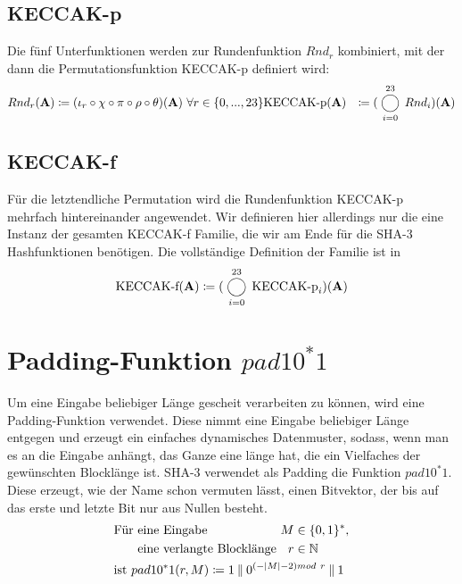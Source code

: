 \subsection{KECCAK-p}
Die fünf Unterfunktionen werden zur Rundenfunktion $Rnd_r$ kombiniert, mit der dann die Permutationsfunktion KECCAK-p definiert wird:
\begin{align*}
	Rnd_r(\textbf{A}) & \coloneq (\iota_r \circ \chi \circ \pi \circ \rho \circ \theta)(\textbf{A})\ \forall r \in \{0,...,23\}
    \text{KECCAK-p} (\textbf{A}) & \coloneq (\bigcomp_{i = 0}^{23} Rnd_i)(\textbf{A}) \\
\end{align*}

\subsection{KECCAK-f}
Für die letztendliche Permutation wird die Rundenfunktion KECCAK-p mehrfach hintereinander angewendet.
Wir definieren hier allerdings nur die eine Instanz der gesamten KECCAK-f Familie, die wir am Ende für die SHA-3 Hashfunktionen benötigen.
Die vollständige Definition der Familie ist in  
\begin{align*}
    \text{KECCAK-f} (\textbf{A}) \coloneq (\bigcomp_{i = 0}^{23} \text{KECCAK-p}_{i})(\textbf{A})
\end{align*}

\section{Padding-Funktion $pad10^*1$}
Um eine Eingabe beliebiger Länge gescheit verarbeiten zu können, wird eine Padding-Funktion verwendet.
Diese nimmt eine Eingabe beliebiger Länge entgegen und erzeugt ein einfaches dynamisches Datenmuster,
sodass, wenn man es an die Eingabe anhängt, das Ganze eine länge hat, die ein Vielfaches der gewünschten Blocklänge ist.
SHA-3 verwendet als Padding die Funktion $pad10^*1$. Diese erzeugt, wie der Name schon vermuten lässt,
einen Bitvektor, der bis auf das erste und letzte Bit nur aus Nullen besteht.
\begin{align*}
	&\begin{alignedat}[t]{2}
	\text{Für} & \text{ eine Eingabe } & M & \in \{0,1\}^*, \\
	& \text{ eine verlangte Blocklänge } & r & \in \mathbb{N} \\
	\end{alignedat} \\
	& \text{ist } pad10^*1(r, M) \coloneq 1 \mathbin\Vert 0^{(-|M| - 2) mod\ r} \mathbin\Vert 1
\end{align*}

